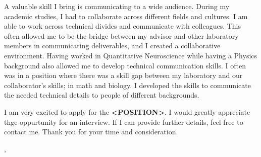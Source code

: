 \documentclass[12pt]{letter}
\begin{document}
A valuable skill I bring is communicating to a wide audience.
During my academic studies, I had to collaborate across different
fields and cultures.
I am able to work across technical divides and communicate with colleagues.
This often allowed me to be the bridge between my advisor and other
laboratory members in communicating deliverables,
and I created a collaborative environment.
Having worked in Quantitative Neuroscience while having a Physics
background also allowed me to develop technical communication skills.
I often was in a position where there was a skill gap between my
laboratory and our collaborator's skills; in math and biology.
I developed the skills to communicate the needed technical details to
people of different backgrounds.

I am very excited to apply for the \textbf{<POSITION>}.
I would greatly appreciate thge oppurtunity for an interview.
If I can provide further details, feel free to contact me.
Thank you for your time and consideration.

\vspace{0.1in}
\vfill

\begin{flushright}
  \closer, \\
  \myname\\
  \mytitle
\end{flushright}
\end{document}
